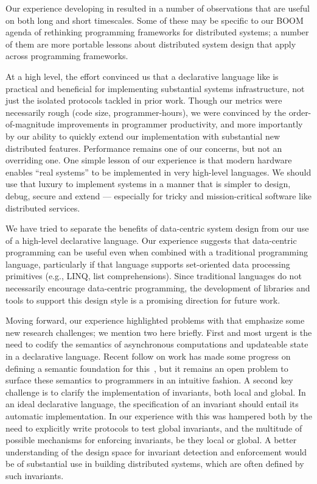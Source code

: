 Our experience developing \BOOMA in \OVERLOG resulted in a number of
observations that are useful on both long and short timescales.  Some of these
may be specific to our BOOM agenda of rethinking programming frameworks for
distributed systems; a number of them are more portable lessons about
distributed system design that apply across programming frameworks.

At a high level, the effort convinced us that a declarative language like
\OVERLOG is practical and beneficial for implementing substantial systems
infrastructure, not just the isolated protocols tackled in prior work.  Though
our metrics were necessarily rough (code size, programmer-hours), we were
convinced by the order-of-magnitude improvements in programmer productivity,
and more importantly by our ability to quickly extend our implementation with
substantial new distributed features.  Performance remains one of our concerns,
but not an overriding one.  One simple lesson of our experience is that modern
hardware enables ``real systems'' to be implemented in very high-level
languages.  We should use that luxury to implement systems in a manner that is
simpler to design, debug, secure and extend --- especially for tricky and
mission-critical software like distributed services.

We have tried to separate the benefits of data-centric system design from our 
use of a high-level declarative language. Our experience suggests that
data-centric programming can be useful even when combined with a traditional
programming language, particularly if that language supports set-oriented data
processing primitives (e.g., LINQ, list comprehensions). Since traditional
languages do not necessarily encourage data-centric programming, the development
of libraries and tools to support this design style is a promising direction for 
future work.

Moving forward, our experience highlighted problems with \OVERLOG that emphasize some
new research challenges; we mention two here briefly.  First and most urgent is
the need to codify the semantics of asynchronous computations and updateable
state in a declarative language.  Recent follow on work has made some progress on
defining a semantic foundation for this~\cite{dedalus-tr}, but it remains an
open problem to surface these semantics to programmers in an intuitive fashion.
A second key challenge is to clarify the implementation of invariants, both
local and global.  In an ideal declarative language, the specification of an
invariant should entail its automatic implementation.  In our experience with
\OVERLOG this was hampered both by the need to explicitly write protocols to test
global invariants, and the multitude of possible mechanisms for enforcing
invariants, be they local or global.  A better understanding of the design space
for invariant detection and enforcement would be of substantial use in building
distributed systems, which are often defined by such invariants.


